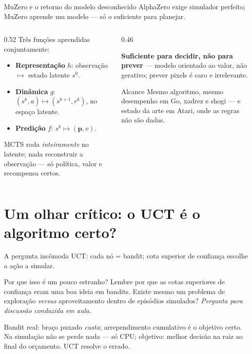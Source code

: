\documentclass[aspectratio=169, 10pt]{beamer}
\newcommand{\paradiscussao}{\smallskip
  {\footnotesize\color{rlCinza}\itshape Pergunta para discussão conduzida em aula.}}
\begin{document}
\begin{frame}{MuZero e o retorno do modelo desconhecido}
  \small
  AlphaZero exige simulador perfeito; MuZero \alert{aprende} um modelo — só o suficiente para planejar.

  \begin{columns}[T]
    \begin{column}{0.52\textwidth}
      Três funções aprendidas conjuntamente:
      \begin{itemize}
        \item \textbf{Representação} $h$: observação $\mapsto$ estado latente $s^0$.
        \item \textbf{Dinâmica} $g$: $(s^k, a) \mapsto (s^{k+1}, r^k)$, no espaço latente.
        \item \textbf{Predição} $f$: $s^k \mapsto (\bm{p}, v)$.
      \end{itemize}
      \medskip
      MCTS roda \emph{inteiramente} no latente; nada reconstruir a observação — só política, valor e recompensa certos.
    \end{column}
    \begin{column}{0.46\textwidth}
      \begin{ideiabox}
        \textbf{Suficiente para decidir, não para prever} — modelo orientado ao valor, não gerativo; prever pixels é caro e irrelevante.
      \end{ideiabox}
      \begin{defbox}{Alcance}
        Mesmo algoritmo, mesmo desempenho em Go, xadrez e shogi --- e estado da
        arte em Atari, onde as regras não são dadas.
      \end{defbox}
    \end{column}
  \end{columns}
\end{frame}

\section{Um olhar crítico: o UCT é o algoritmo certo?}

\begin{frame}{A pergunta incômoda}
  \small
  UCT: cada nó = bandit; cota superior de confiança escolhe a ação a simular.

  \begin{quizbox}{}
    Por que isso é um pouco estranho? Lembre por que as cotas superiores de
    confiança eram uma boa ideia em bandits. Existe mesmo um problema de
    exploração \emph{versus} aproveitamento \alert{dentro} de episódios
    simulados?
    \paradiscussao
  \end{quizbox}

  \pause
  \begin{respbox}
    Bandit real: braço puxado \emph{custa}; arrependimento cumulativo é o objetivo certo. Na simulação não se perde nada — só CPU; objetivo: \alert{melhor decisão na raiz ao final do orçamento}. UCT resolve o errado.
  \end{respbox}
\end{frame}
\end{document}
